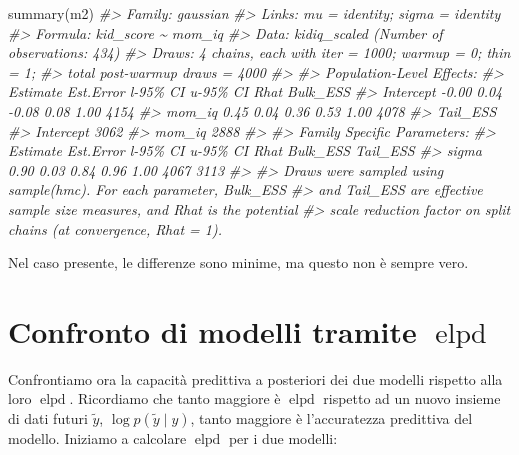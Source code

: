 \documentclass[
  10pt,
  italian,
  a4paper,
  extrafontsizes,onecolumn,openright
  ]{memoir}
\newenvironment{Shaded}{\begin{snugshade}}{\end{snugshade}}
\newcommand{\CommentTok}[1]{\textcolor[rgb]{0.56,0.35,0.01}{\textit{#1}}}
\newcommand{\FunctionTok}[1]{\textcolor[rgb]{0.00,0.00,0.00}{#1}}
\newcommand{\NormalTok}[1]{#1}
\DeclareMathOperator{\elpd}{elpd} %
\theoremstyle{definition}
\theoremstyle{definition}
\theoremstyle{definition}
\theoremstyle{definition}
\theoremstyle{remark}
\begin{document}
\begin{Shaded}
\begin{Highlighting}[]
\FunctionTok{summary}\NormalTok{(m2)}
\CommentTok{\#\textgreater{}  Family: gaussian }
\CommentTok{\#\textgreater{}   Links: mu = identity; sigma = identity }
\CommentTok{\#\textgreater{} Formula: kid\_score \textasciitilde{} mom\_iq }
\CommentTok{\#\textgreater{}    Data: kidiq\_scaled (Number of observations: 434) }
\CommentTok{\#\textgreater{}   Draws: 4 chains, each with iter = 1000; warmup = 0; thin = 1;}
\CommentTok{\#\textgreater{}          total post{-}warmup draws = 4000}
\CommentTok{\#\textgreater{} }
\CommentTok{\#\textgreater{} Population{-}Level Effects: }
\CommentTok{\#\textgreater{}           Estimate Est.Error l{-}95\% CI u{-}95\% CI Rhat Bulk\_ESS}
\CommentTok{\#\textgreater{} Intercept    {-}0.00      0.04    {-}0.08     0.08 1.00     4154}
\CommentTok{\#\textgreater{} mom\_iq        0.45      0.04     0.36     0.53 1.00     4078}
\CommentTok{\#\textgreater{}           Tail\_ESS}
\CommentTok{\#\textgreater{} Intercept     3062}
\CommentTok{\#\textgreater{} mom\_iq        2888}
\CommentTok{\#\textgreater{} }
\CommentTok{\#\textgreater{} Family Specific Parameters: }
\CommentTok{\#\textgreater{}       Estimate Est.Error l{-}95\% CI u{-}95\% CI Rhat Bulk\_ESS Tail\_ESS}
\CommentTok{\#\textgreater{} sigma     0.90      0.03     0.84     0.96 1.00     4067     3113}
\CommentTok{\#\textgreater{} }
\CommentTok{\#\textgreater{} Draws were sampled using sample(hmc). For each parameter, Bulk\_ESS}
\CommentTok{\#\textgreater{} and Tail\_ESS are effective sample size measures, and Rhat is the potential}
\CommentTok{\#\textgreater{} scale reduction factor on split chains (at convergence, Rhat = 1).}
\end{Highlighting}
\end{Shaded}

\noindent
Nel caso presente, le differenze sono minime, ma questo non è sempre vero.

\hypertarget{confronto-di-modelli-tramite-elpd}{%
\section{\texorpdfstring{Confronto di modelli tramite \(\elpd\)}{Confronto di modelli tramite \textbackslash elpd}}\label{confronto-di-modelli-tramite-elpd}}

Confrontiamo ora la capacità predittiva a posteriori dei due modelli rispetto alla loro \(\elpd\). Ricordiamo che tanto maggiore è \(\elpd\) rispetto ad un nuovo insieme di dati futuri \(\tilde{y}\), \(\log p(\tilde{y} \mid y)\), tanto maggiore è l'accuratezza predittiva del modello. Iniziamo a calcolare \(\elpd\) per i due modelli:
\end{document}
